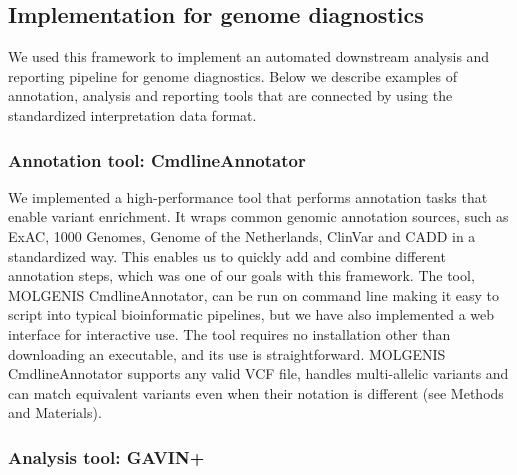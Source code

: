 \subsection{Implementation for genome diagnostics}

We used this framework to implement an automated downstream analysis and reporting pipeline for genome diagnostics.
Below we describe examples of annotation, analysis and reporting tools that are connected by using the standardized interpretation data format.

\subsubsection{Annotation tool: CmdlineAnnotator}

We implemented a high-performance tool that performs annotation tasks that enable variant enrichment.
It wraps common genomic annotation sources, such as ExAC\cite{Lek_2016}, 1000 Ge\-nomes\cite{Auton_2015}, Ge\-nome of the Ne\-ther\-lands\cite{Francioli_2014}, Clin\-Var\cite{Landrum_2015} and CADD\cite{Kircher_2014} in a standardized way. 
This enables us to quickly add and combine different annotation steps, which was one of our goals with this framework.
The tool, MOLGENIS CmdlineAnnotator, can be run on command line making it easy to script into typical bioinformatic pipelines, but we have also implemented a web interface for interactive use.
The tool requires no installation other than downloading an executable, and its use is straightforward.
MOLGENIS CmdlineAnnotator supports any valid VCF file, handles multi-allelic variants and can match equivalent variants even when their notation is different (see Methods and Materials).

\subsubsection{Analysis tool: GAVIN+}

